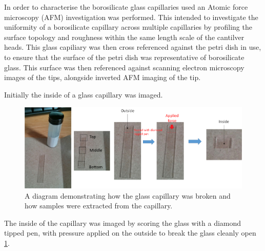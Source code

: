 In order to characterise the borosilicate glass capillaries used an Atomic force microscopy (AFM) investigation was performed. This intended to investigate the uniformity of a borosilicate capillary across multiple capillaries by profiling the surface topology and roughness within the same length scale of the cantilver heads. This glass capiliary was then cross referenced against the petri dish in use, to ensure that the surface of the petri dish was representative of borosilicate glass. This surface was then referenced against scanning electron microscopy images of the tips, alongside inverted AFM imaging of the tip.

Initially the inside of a glass capillary was imaged.

\begin{figure}[h]     %
        \begin{center}
          \includegraphics[width=120mm]{chapter3/Figure8.png}
\end{center}
\caption{A diagram demonstrating how the glass capillary was broken and how samples were extracted from the capillary.}
\label{fig:figure8}                 %
\end{figure}   

The inside of the capillary was imaged by scoring the glass with a diamond tipped pen, with pressure applied on the outside to break the glass cleanly open \ref{fig:figure8}. 

